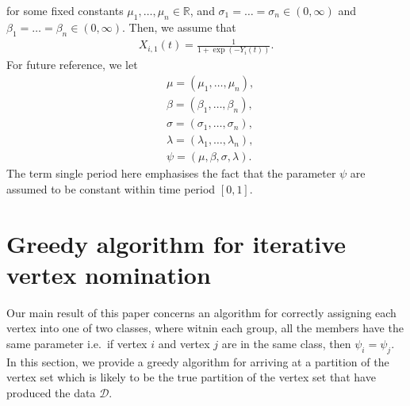 \documentclass[12pt]{article}%
\begin{document}
for some fixed constants $\mu_1,\ldots, \mu_n \in \mathbb R$, and $\sigma_1 = \ldots = \sigma_n \in (0,\infty)$ and $\beta_1 = \ldots = \beta_n \in (0,\infty)$. 
Then, we assume that 
\begin{eqnarray}
X_{i,1}(t) = \frac{1}{1+\exp(-Y_i(t))}.
\end{eqnarray}
For future reference, we let
\begin{eqnarray}
&\mu = (\mu_1,\ldots, \mu_n),\\
&\beta = (\beta_1,\ldots,\beta_n),\\
&\sigma = (\sigma_1,\ldots,\sigma_n),\\
&\lambda = (\lambda_1,\ldots,\lambda_n),\\
&\psi = (\mu,\beta,\sigma,\lambda).
\end{eqnarray}
The term single period here emphasises the fact that the parameter $\psi$ 
are assumed to be constant within time period $[0,1]$. 
\section{Greedy algorithm for iterative vertex nomination}
Our main result of this paper concerns an algorithm 
for correctly assigning each vertex into one of two classes, where witnin each group, all the members  
have the same parameter i.e.\ if vertex $i$ and vertex $j$ are in the same
class, then $\psi_i = \psi_j$.  
In this section, we provide a greedy algorithm for arriving at a partition 
of the vertex set which is likely to be the true partition of 
the vertex set that  have produced the data $\mathcal D$.
\end{document}
